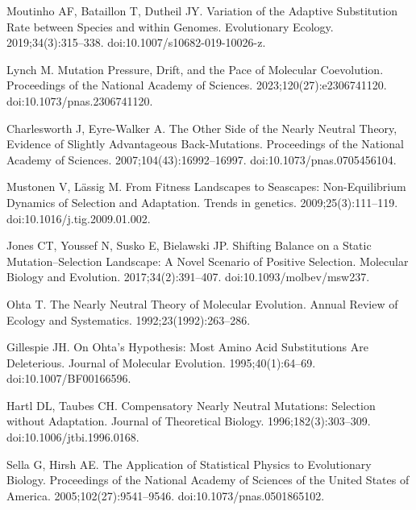\documentclass[10pt,letterpaper]{article}
\begin{document}
\begin{thebibliography}{10}
Moutinho AF, Bataillon T, Dutheil JY.
\newblock Variation of the Adaptive Substitution Rate between Species and
within Genomes.
\newblock Evolutionary Ecology. 2019;34(3):315--338.
\newblock doi:{10.1007/s10682-019-10026-z}.

Lynch M.
\newblock Mutation Pressure, Drift, and the Pace of Molecular Coevolution.
\newblock Proceedings of the National Academy of Sciences.
2023;120(27):e2306741120.
\newblock doi:{10.1073/pnas.2306741120}.

Charlesworth J, {Eyre-Walker} A.
\newblock The Other Side of the Nearly Neutral Theory, Evidence of Slightly
Advantageous Back-Mutations.
\newblock Proceedings of the National Academy of Sciences.
2007;104(43):16992--16997.
\newblock doi:{10.1073/pnas.0705456104}.

Mustonen V, L{\"a}ssig M.
\newblock From Fitness Landscapes to Seascapes: Non-Equilibrium Dynamics of
Selection and Adaptation.
\newblock Trends in genetics. 2009;25(3):111--119.
\newblock doi:{10.1016/j.tig.2009.01.002}.

Jones CT, Youssef N, Susko E, Bielawski JP.
\newblock Shifting Balance on a Static Mutation--Selection Landscape: A Novel
Scenario of Positive Selection.
\newblock Molecular Biology and Evolution. 2017;34(2):391--407.
\newblock doi:{10.1093/molbev/msw237}.

Ohta T.
\newblock The Nearly Neutral Theory of Molecular Evolution.
\newblock Annual Review of Ecology and Systematics. 1992;23(1992):263--286.

Gillespie JH.
\newblock On {{Ohta}}'s Hypothesis: {{Most}} Amino Acid Substitutions Are
Deleterious.
\newblock Journal of Molecular Evolution. 1995;40(1):64--69.
\newblock doi:{10.1007/BF00166596}.

Hartl DL, Taubes CH.
\newblock Compensatory Nearly Neutral Mutations: {{Selection}} without
Adaptation.
\newblock Journal of Theoretical Biology. 1996;182(3):303--309.
\newblock doi:{10.1006/jtbi.1996.0168}.

Sella G, Hirsh AE.
\newblock The Application of Statistical Physics to Evolutionary Biology.
\newblock Proceedings of the National Academy of Sciences of the United States
of America. 2005;102(27):9541--9546.
\newblock doi:{10.1073/pnas.0501865102}.


\end{thebibliography}
\end{document}
